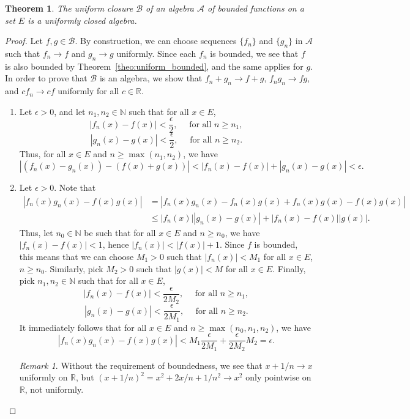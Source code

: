 \documentclass[11pt]{article}
\def\R{\mathbb{R}}
\def\N{\mathbb{N}}
\newtheorem{theorem}{Theorem}[section]
\theoremstyle{definition}
\theoremstyle{remark}
\newtheorem*{remark}{Remark}
\begin{document}
    \begin{theorem}
        The uniform closure $\mathscr{B}$ of an algebra $\mathscr{A}$ of bounded
        functions on a set $E$ is a uniformly closed algebra.
    \end{theorem}
    \begin{proof}
        Let $f, g \in \mathscr{B}$. By construction, we can choose sequences
        $\{f_n\}$ and $\{g_n\}$ in $\mathscr{A}$ such that $f_n \to f$ and $g_n \to
        g$ uniformly. Since each $f_n$ is bounded, we see that $f$ is also bounded by
        Theorem~\ref{theo:uniform_bounded}, and the same applies for $g$. In order to
        prove that $\mathscr{B}$ is an algebra, we show that $f_n + g_n \to f + g$,
        $f_ng_n \to fg$, and $cf_n \to cf$ uniformly for all $c \in \R$.
        \begin{enumerate}
            \item Let $\epsilon > 0$, and let $n_1, n_2 \in \N$ such that for all $x
            \in E$, \[
                |f_n(x) - f(x)| < \frac{\epsilon}{2}, \quad \text{ for all } n \geq n_1,
            \] \[
                |g_n(x) - g(x)| < \frac{\epsilon}{2}, \quad \text{ for all } n \geq n_2.
            \] Thus, for all $x \in E$ and $n \geq \max(n_1, n_2)$, we have \[
                |(f_n(x) - g_n(x)) - (f(x) + g(x))| < |f_n(x) - f(x)| + |g_n(x) -
                g(x)| < \epsilon.
            \] 

            \item Let $\epsilon > 0$. Note that \begin{align*}
                |f_n(x)g_n(x) - f(x)g(x)| &= |f_n(x)g_n(x) - f_n(x)g(x) + f_n(x)g(x)
                - f(x)g(x)| \\
                & \leq |f_n(x)| |g_n(x) - g(x)| + |f_n(x) - f(x)| |g(x)|.
            \end{align*}
            Thus, let $n_0 \in \N$ be such that for all $x \in E$ and $n \geq n_0$,
            we have $|f_n(x) - f(x)| < 1$, hence $|f_n(x)| < |f(x)| + 1$. Since $f$
            is bounded, this means that we can choose $M_1 > 0$ such that $|f_n(x)| <
            M_1$ for all $x \in E$, $n \geq n_0$. Similarly, pick $M_2 > 0$ such that
            $|g(x)| < M$ for all $x \in E$. Finally, pick $n_1, n_2 \in \N$ such that
            for all $x \in E$, \[
                |f_n(x) - f(x)| < \frac{\epsilon}{2M_2}, \quad \text{ for all } n
                \geq n_1,
            \] \[
                |g_n(x) - g(x)| < \frac{\epsilon}{2M_1}, \quad \text{ for all } n
                \geq n_2.
            \] It immediately follows that for all $x \in E$ and $n \geq \max(n_0,
            n_1, n_2)$, we have \[
                |f_n(x)g_n(x) - f(x)g(x)| < M_1\frac{\epsilon}{2M_1} +
                \frac{\epsilon}{2M_2}M_2 = \epsilon.
            \] 
            \begin{remark}
                Without the requirement of boundedness, we see that $x + 1 / n \to x$
                uniformly on $\R$, but $(x + 1 / n)^2 = x^2 + 2x / n + 1 / n^2 \to
                x^2$ only pointwise on $\R$, not uniformly.
            \end{remark}


\end{enumerate}
\end{proof}
\end{document}
